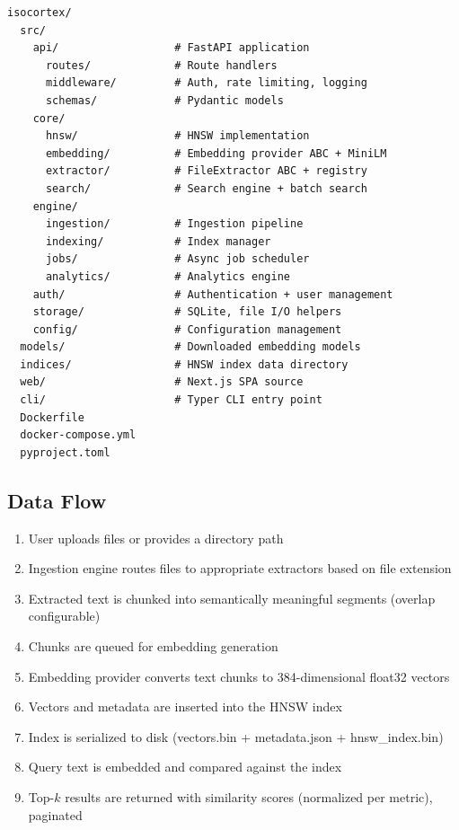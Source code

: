 \documentclass[11pt,a4paper]{article}
\begin{document}
\begin{lstlisting}[language={},title={Project Layout}]
isocortex/
  src/
    api/                  # FastAPI application
      routes/             # Route handlers
      middleware/         # Auth, rate limiting, logging
      schemas/            # Pydantic models
    core/
      hnsw/               # HNSW implementation
      embedding/          # Embedding provider ABC + MiniLM
      extractor/          # FileExtractor ABC + registry
      search/             # Search engine + batch search
    engine/
      ingestion/          # Ingestion pipeline
      indexing/           # Index manager
      jobs/               # Async job scheduler
      analytics/          # Analytics engine
    auth/                 # Authentication + user management
    storage/              # SQLite, file I/O helpers
    config/               # Configuration management
  models/                 # Downloaded embedding models
  indices/                # HNSW index data directory
  web/                    # Next.js SPA source
  cli/                    # Typer CLI entry point
  Dockerfile
  docker-compose.yml
  pyproject.toml
\end{lstlisting}

\subsection{Data Flow}

\begin{enumerate}
    \item User uploads files or provides a directory path
    \item Ingestion engine routes files to appropriate extractors based on file extension
    \item Extracted text is chunked into semantically meaningful segments (overlap configurable)
    \item Chunks are queued for embedding generation
    \item Embedding provider converts text chunks to 384-dimensional float32 vectors
    \item Vectors and metadata are inserted into the HNSW index
    \item Index is serialized to disk (vectors.bin + metadata.json + hnsw\_index.bin)
    \item Query text is embedded and compared against the index
    \item Top-$k$ results are returned with similarity scores (normalized per metric), paginated
\end{enumerate}
\end{document}
